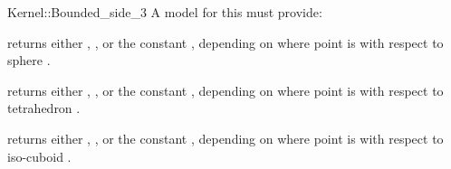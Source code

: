 \begin{ccRefFunctionObjectConcept}{Kernel::Bounded_side_3}
A model for this must provide:


{returns either ,
, or the constant
, depending on where point  is with
respect to sphere . }

{returns either ,
, or the constant
, depending on where point  is with
respect to tetrahedron . }

{returns either ,
, or the constant
, depending on where point  is with
respect to iso-cuboid . }

\end{ccRefFunctionObjectConcept}
